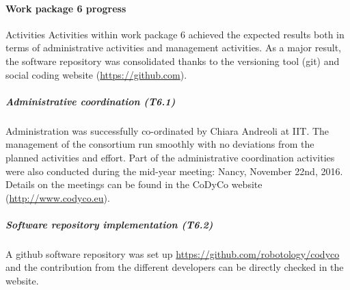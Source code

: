 

\paragraph{Work package 6 progress}

Activities Activities within work package 6 achieved the expected results both in terms of administrative activities and management activities. As a major result, the software repository was consolidated thanks to the versioning tool (git) and social coding website (\url{https://github.com}).

\subparagraph{Administrative coordination (T6.1)}
Administration was successfully co-ordinated by Chiara Andreoli at IIT. The management of the consortium run smoothly with no deviations from the planned activities and effort.
Part of the administrative coordination activities were also conducted during the mid-year meeting: Nancy, November 22nd, 2016. Details on the meetings can be found in the CoDyCo website (\url{http://www.codyco.eu}).

\subparagraph{Software repository implementation (T6.2)}

A github software repository was set up \url{https://github.com/robotology/codyco} and the contribution from the different developers can be directly checked in the website.
